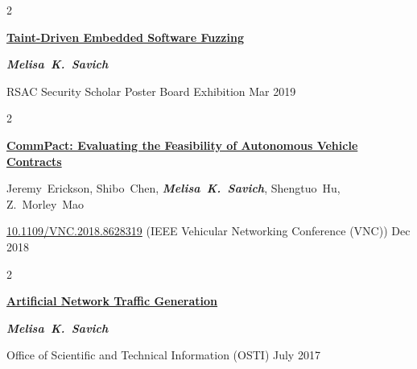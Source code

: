 \documentclass[10pt, a4paper]{article}
\newenvironment{twocolentry}[2][]{
    \onecolentry
    \def\secondColumn{#2}
    \setcolumnwidth{\fill, 4 cm}
    \begin{paracol}{2}
}{
    \switchcolumn \raggedleft \secondColumn
    \end{paracol}
    \endonecolentry
} %
\begin{document}
        \vspace{0.5 cm}

        \begin{samepage}
            \begin{twocolentry}{
                Mar 2019
            }
                \textbf{\href{https://melisasavich.com/pubs/taint-driven-embedded-software-fuzzing-poster.pdf}{Taint-Driven Embedded Software Fuzzing}}

                \vspace{0.1 cm}

                \mbox{\textbf{\textit{Melisa K. Savich}}}
                \vspace{0.1 cm}

        RSAC Security Scholar Poster Board Exhibition    \end{twocolentry}
        \end{samepage}

        \vspace{0.5 cm}

        \begin{samepage}
            \begin{twocolentry}{
                Dec 2018
            }
                \textbf{\href{https://melisasavich.com/pubs/commpact-evaluating-autonomous-vehicle-contracts.pdf}{CommPact: Evaluating the Feasibility of Autonomous Vehicle Contracts}}

                \vspace{0.1 cm}

                \mbox{Jeremy Erickson}, \mbox{Shibo Chen}, \mbox{\textbf{\textit{Melisa K. Savich}}}, \mbox{Shengtuo Hu}, \mbox{Z. Morley Mao}
                \vspace{0.1 cm}

        \href{https://doi.org/10.1109/VNC.2018.8628319}{10.1109/VNC.2018.8628319}
         (IEEE Vehicular Networking Conference (VNC))    \end{twocolentry}
        \end{samepage}

        \vspace{0.5 cm}

        \begin{samepage}
            \begin{twocolentry}{
                July 2017
            }
                \textbf{\href{https://melisasavich.com/pubs/artificial-network-traffic-generation-poster.pdf}{Artificial Network Traffic Generation}}

                \vspace{0.1 cm}

                \mbox{\textbf{\textit{Melisa K. Savich}}}
                \vspace{0.1 cm}

        Office of Scientific and Technical Information (OSTI)    \end{twocolentry}
        \end{samepage}
\end{document}
